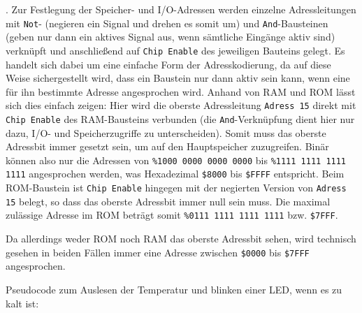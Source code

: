 . Zur Festlegung der Speicher- und I/O-Adressen werden einzelne Adressleitungen
mit \texttt{Not}- (negieren ein Signal und drehen es somit um) und \texttt{And}-Bausteinen
(geben nur dann ein aktives Signal aus, wenn sämtliche Eingänge aktiv sind)
verknüpft und anschließend auf \texttt{Chip\,Enable} des jeweiligen Bauteins
gelegt. Es handelt sich dabei um eine einfache Form der Adresskodierung, da
auf diese Weise sichergestellt wird, dass ein Baustein nur dann aktiv sein kann,
wenn eine für ihn bestimmte Adresse angesprochen wird. Anhand von RAM und ROM
lässt sich dies einfach zeigen: Hier wird die oberste Adressleitung \texttt{Adress\,15}
direkt mit \texttt{Chip\,Enable} des RAM-Bausteins verbunden (die \texttt{And}-Verknüpfung
dient hier nur dazu, I/O- und Speicherzugriffe zu unterscheiden). Somit muss das
oberste Adressbit immer gesetzt sein, um auf den Hauptspeicher zuzugreifen.
Binär können also nur die Adressen von \texttt{\%1000\,0000\,0000\,0000} bis
\texttt{\%1111\,1111\,1111\,1111} angesprochen werden, was Hexadezimal \texttt{\$8000}
bis \texttt{\$FFFF} entspricht. Beim ROM-Baustein ist \texttt{Chip\,Enable}
hingegen mit der negierten Version von \texttt{Adress\,15} belegt, so dass das
oberste Adressbit immer null sein muss. Die maximal zulässige Adresse im ROM
beträgt somit \texttt{\%0111\,1111\,1111\,1111} bzw. \texttt{\$7FFF}.

{
    \footnotesize
    Da allerdings weder ROM noch RAM das oberste Adressbit sehen, wird technisch
    gesehen in beiden Fällen immer eine Adresse zwischen \texttt{\$0000} bis \texttt{\$7FFF}
    angesprochen.
}

\clearpage

\teilaufgabe
Pseudocode zum Auslesen der Temperatur und blinken einer LED, wenn es zu kalt ist:

